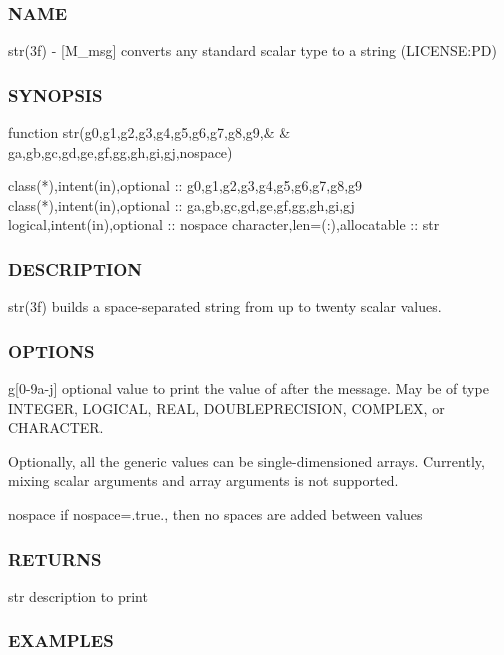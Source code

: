 \subsubsection*{N\+A\+ME}

str(3f) -\/ \mbox{[}M\+\_\+msg\mbox{]} converts any standard scalar type to a string (L\+I\+C\+E\+N\+SE\+:PD) 

\subsubsection*{S\+Y\+N\+O\+P\+S\+IS}

\begin{DoxyVerb} function str(g0,g1,g2,g3,g4,g5,g6,g7,g8,g9,&
 & ga,gb,gc,gd,ge,gf,gg,gh,gi,gj,nospace)

  class(*),intent(in),optional  :: g0,g1,g2,g3,g4,g5,g6,g7,g8,g9
  class(*),intent(in),optional  :: ga,gb,gc,gd,ge,gf,gg,gh,gi,gj
  logical,intent(in),optional   :: nospace
  character,len=(:),allocatable :: str
\end{DoxyVerb}


\subsubsection*{D\+E\+S\+C\+R\+I\+P\+T\+I\+ON}

str(3f) builds a space-\/separated string from up to twenty scalar values.

\subsubsection*{O\+P\+T\+I\+O\+NS}

g\mbox{[}0-\/9a-\/j\mbox{]} optional value to print the value of after the message. May be of type I\+N\+T\+E\+G\+ER, L\+O\+G\+I\+C\+AL, R\+E\+AL, D\+O\+U\+B\+L\+E\+P\+R\+E\+C\+I\+S\+I\+ON, C\+O\+M\+P\+L\+EX, or C\+H\+A\+R\+A\+C\+T\+ER.

Optionally, all the generic values can be single-\/dimensioned arrays. Currently, mixing scalar arguments and array arguments is not supported.

nospace if nospace=.true., then no spaces are added between values

\subsubsection*{R\+E\+T\+U\+R\+NS}

str description to print

\subsubsection*{E\+X\+A\+M\+P\+L\+ES}


